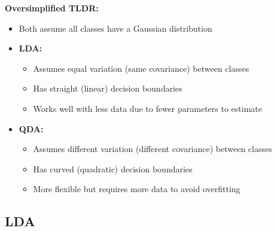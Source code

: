 \documentclass{article}
\begin{document}
\textbf{Oversimplified TLDR:}
\begin{itemize}
    \item Both assume all classes have a Gaussian distribution
    \item \textbf{LDA:}
    \begin{itemize}
        \item Assumes equal variation (same covariance) between classes
        \item Has straight (linear) decision boundaries
        \item Works well with less data due to fewer parameters to estimate
    \end{itemize}
    \item \textbf{QDA:}
    \begin{itemize}
        \item Assumes different variation (different covariance) between classes
        \item Has curved (quadratic) decision boundaries
        \item More flexible but requires more data to avoid overfitting
    \end{itemize}
\end{itemize}

\subsection{LDA}
\end{document}
